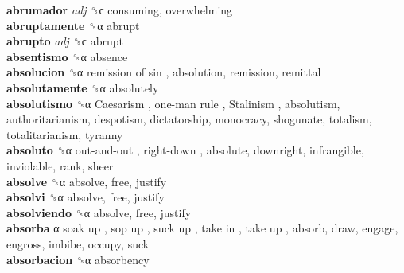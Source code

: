 \textbf{abrumador} \emph{adj}  ␝ϲ  consuming, overwhelming  \\
\textbf{abruptamente} ␝α  abrupt  \\
\textbf{abrupto} \emph{adj}  ␝ϲ  abrupt  \\
\textbf{absentismo} ␝α  absence  \\
\textbf{absolucion} ␝α   remission of sin , absolution, remission, remittal  \\
\textbf{absolutamente} ␝α  absolutely  \\
\textbf{absolutismo} ␝α   Caesarism ,  one-man rule ,  Stalinism , absolutism, authoritarianism, despotism, dictatorship, monocracy, shogunate, totalism, totalitarianism, tyranny  \\
\textbf{absoluto} ␝α   out-and-out ,  right-down , absolute, downright, infrangible, inviolable, rank, sheer  \\
\textbf{absolve} ␝α  absolve, free, justify  \\
\textbf{absolvi} ␝α  absolve, free, justify  \\
\textbf{absolviendo} ␝α  absolve, free, justify  \\
\textbf{absorba} α   soak up ,  sop up ,  suck up ,  take in ,  take up , absorb, draw, engage, engross, imbibe, occupy, suck  \\
\textbf{absorbacion} ␝α  absorbency  \\

